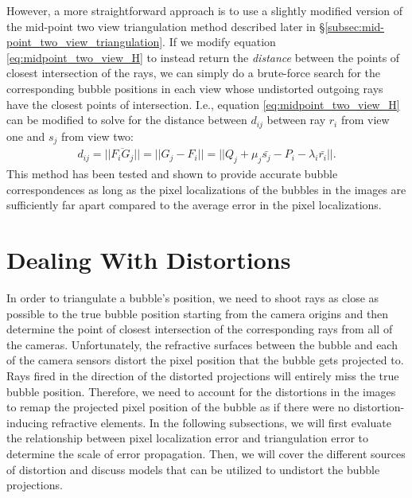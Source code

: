 \documentclass[11pt, letterpaper]{extarticle} %
\begin{document}
However, a more straightforward approach is to use a slightly modified version of the mid-point two view triangulation method described later in \S\ref{subsec:mid-point_two_view_triangulation}. If we modify equation \ref{eq:midpoint_two_view_H} to instead return the \textit{distance} between the points of closest intersection of the rays, we can simply do a brute-force search for the corresponding bubble positions in each view whose undistorted outgoing rays have the closest points of intersection. I.e., equation \ref{eq:midpoint_two_view_H} can be modified to solve for the distance between $d_{ij}$ between ray $r_i$ from view one and $s_j$ from view two:
\begin{align}
    d_{ij} = || \overline{F_i G_j} || = || G_j - F_i || = || Q_j + \mu_j \bar{s_j} - P_i - \lambda_i \bar{r_i} ||.
\end{align}
This method has been tested and shown to provide accurate bubble correspondences as long as the pixel localizations of the bubbles in the images are sufficiently far apart compared to the average error in the pixel localizations.

\section{Dealing With Distortions} \label{sec:dealing_with_distortions}
In order to triangulate a bubble's position, we need to shoot rays as close as possible to the true bubble position starting from the camera origins and then determine the point of closest intersection of the corresponding rays from all of the cameras. Unfortunately, the refractive surfaces between the bubble and each of the camera sensors distort the pixel position that the bubble gets projected to. Rays fired in the direction of the distorted projections will entirely miss the true bubble position. Therefore, we need to account for the distortions in the images to remap the projected pixel position of the bubble as if there were no distortion-inducing refractive elements. In the following subsections, we will first evaluate the relationship between pixel localization error and triangulation error to determine the scale of error propagation. Then, we will cover the different sources of distortion and discuss models that can be utilized to undistort the bubble projections. 
\end{document}
